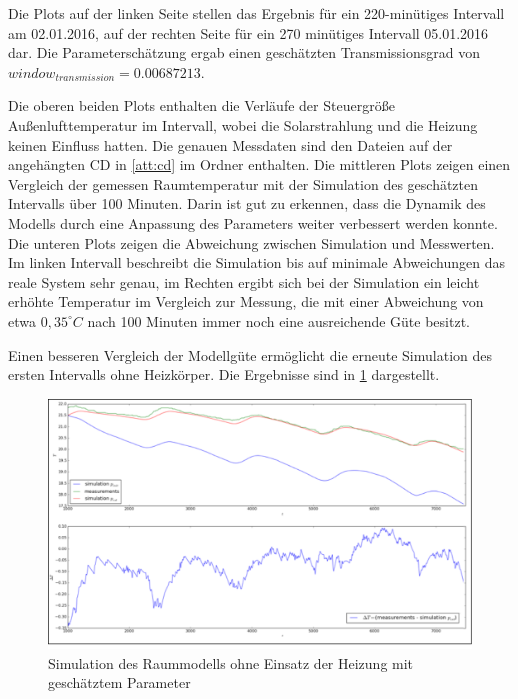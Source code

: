Die Plots auf der linken Seite stellen das Ergebnis für ein 220-minütiges Intervall am 02.01.2016, auf der rechten Seite für ein 270 minütiges Intervall 05.01.2016 dar. Die Parameterschätzung ergab einen geschätzten Transmissionsgrad von $window_{transmission}=0.00687213$.
 
Die oberen beiden Plots enthalten die Verläufe der Steuergröße Außenlufttemperatur im Intervall, wobei die Solarstrahlung und die Heizung keinen Einfluss hatten. Die genauen Messdaten sind den Dateien auf der angehängten CD in \ref{att:cd} im Ordner enthalten. Die mittleren Plots zeigen einen Vergleich der gemessen Raumtemperatur mit der Simulation des geschätzten Intervalls über 100 Minuten. Darin ist gut zu erkennen, dass die Dynamik des Modells durch eine Anpassung des Parameters weiter verbessert werden konnte. Die unteren Plots zeigen die Abweichung zwischen Simulation und Messwerten. Im linken Intervall beschreibt die Simulation bis auf minimale Abweichungen das reale System sehr genau, im Rechten ergibt sich bei der Simulation ein leicht erhöhte Temperatur im Vergleich zur Messung, die mit einer Abweichung von etwa $0,35^{\circ}C$ nach 100 Minuten immer noch eine ausreichende Güte besitzt.







Einen besseren Vergleich der Modellgüte ermöglicht die erneute Simulation des ersten Intervalls ohne Heizkörper. Die Ergebnisse sind in \ref{fig:valid1pe} dargestellt.

\begin{figure}
\centering
\includegraphics[width=\textwidth]{abbildungen/20160329_validierung1pe}
\caption{Simulation des Raummodells ohne Einsatz der Heizung mit geschätztem Parameter}
\label{fig:valid1pe}
\end{figure}

